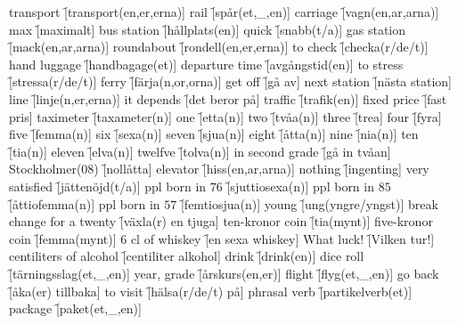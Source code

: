 \begin{questions}
    \begin{multicols}{2}
        \raggedcolumns
        \question transport \f[transport(en,er,erna)]
        \question rail \f[spår(et,\_,en)]
        \question carriage \f[vagn(en,ar,arna)]
        \question max \f[maximalt]
        \question bus station \f[hållplats(en)]
        \question quick \f[snabb(t/a)]
        \question gas station \f[mack(en,ar,arna)]
        \question roundabout \f[rondell(en,er,erna)]
        \question to check \f[checka(r/de/t)]
        \question hand luggage \f[handbagage(et)]
        \question departure time \f[avgångstid(en)]
        \question to stress \f[stressa(r/de/t)]
        \question ferry \f[färja(n,or,orna)]
        \question get off \f[gå av]
        \question next station \f[nästa station]
        \question line \f[linje(n,er,erna)]
        \question it depends \f[det beror på]
        \question traffic \f[trafik(en)]
        \question fixed price \f[fast pris]
        \question taximeter \f[taxameter(n)]
        \question one \f[etta(n)]
        \question two \f[tvåa(n)]
        \question three \f[trea]
        \question four \f[fyra]
        \question five \f[femma(n)]
        \question six \f[sexa(n)]
        \question seven \f[sjua(n)]
        \question eight \f[åtta(n)]
        \question nine \f[nia(n)]
        \question ten \f[tia(n)]
        \question eleven \f[elva(n)]
        \question twelfve \f[tolva(n)]
        \question in second grade \f[gå in tvåan]
        \question Stockholmer($08$) \f[nollåtta]
        \question elevator \f[hiss(en,ar,arna)]
        \question nothing \f[ingenting]
        \question very satisfied \f[jättenöjd(t/a)]
        \question ppl born in $76$ \f[sjuttiosexa(n)]
        \question ppl born in $85$ \f[åttiofemma(n)]
        \question ppl born in $57$ \f[femtiosjua(n)]
        \question young \f[ung(yngre/yngst)]
        \question break change for a twenty \f[växla(r) en tjuga]
        \question ten-kronor coin \f[tia(mynt)]
        \question five-kronor coin \f[femma(mynt)]
        \question $6$ cl of whiskey \f[en sexa whiskey]
        \question What luck! \f[Vilken tur!]
        \question centiliters of alcohol \f[centiliter alkohol]
        \question drink \f[drink(en)]
        \question dice roll \f[tärningsslag(et,\_,en)]
        \question year, grade \f[årskurs(en,er)]
        \question flight \f[flyg(et,\_,en)]
        \question go back \f[åka(er) tillbaka]
        \question to visit \f[hälsa(r/de/t) på]
        \question phrasal verb \f[partikelverb(et)]
        \question package \f[paket(et,\_,en)]

\end{multicols}
\end{questions}
